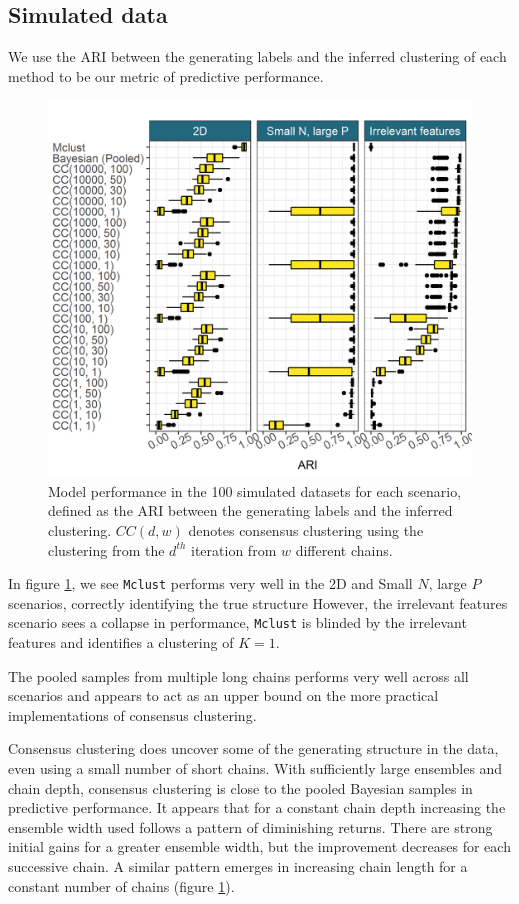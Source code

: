 \documentclass{bmcart}
\begin{document}
	\subsection*{Simulated data}
	We use the ARI between the generating labels and the inferred clustering of each method to be our metric of predictive performance.
	\begin{figure} %
		\centering
		\includegraphics[scale=0.75]{./Images/Simulations/simulation_model_prediction.png}
		\caption{Model performance in the 100 simulated datasets for each scenario, defined as the ARI between the generating labels and the inferred clustering. $CC(d, w)$ denotes consensus clustering using the clustering from the $d^{th}$ iteration from $w$ different chains. }
		\label{fig:simResults}
	\end{figure}
	In figure \ref{fig:simResults}, we see \texttt{Mclust} performs very well in the 2D and Small $N$, large $P$ scenarios, correctly identifying the true structure However, the irrelevant features scenario sees a collapse in performance,	\texttt{Mclust} is blinded by the irrelevant features and identifies a clustering of $K=1$. 
	
	The pooled samples from multiple long chains performs very well across all scenarios and appears to act as an upper bound on the more practical implementations of consensus clustering.
	
	Consensus clustering does uncover some of the generating structure in the data, even using a small number of short chains. With sufficiently large ensembles and chain depth, consensus clustering is close to the pooled Bayesian samples in predictive performance. It appears that for a constant chain depth increasing the ensemble width used follows a pattern of diminishing returns. There are strong initial gains for a greater ensemble width, but the improvement decreases for each successive chain. A similar pattern emerges in increasing chain length for a constant number of chains (figure \ref{fig:simResults}). 
	
\end{document}
